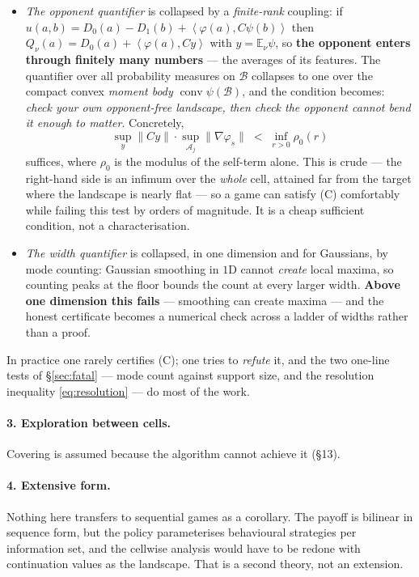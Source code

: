 \documentclass[11pt]{article}
\theoremstyle{definition}
\newcommand{\E}{\mathbb{E}}
\newcommand{\cA}{\mathcal{A}}
\newcommand{\cB}{\mathcal{B}}
\newcommand{\ip}[2]{\left\langle #1, #2 \right\rangle}
\DeclareMathOperator{\conv}{conv}
\begin{document}
\begin{itemize}[leftmargin=1.4em, itemsep=3pt]
\item \emph{The opponent quantifier} is collapsed by a \emph{finite-rank}
  coupling: if $u(a,b) = D_0(a) - D_1(b) + \ip{\varphi(a)}{C\psi(b)}$ then
  $Q_\nu(a) = D_0(a) + \ip{\varphi(a)}{Cy}$ with $y = \E_\nu \psi$, so
  \textbf{the opponent enters through finitely many numbers} --- the averages of
  its features. The quantifier over all probability measures on $\cB$ collapses
  to one over the compact convex \emph{moment body} $\conv \psi(\cB)$, and the
  condition becomes: \emph{check your own opponent-free landscape, then check the
  opponent cannot bend it enough to matter}. Concretely,
  \[
    \sup_{y} \|Cy\| \cdot \sup_{\cA_j}\|\nabla\varphi_s\|
    \;<\; \inf_{r>0} \rho_0(r)
  \]
  suffices, where $\rho_0$ is the modulus of the self-term alone. This is crude
  --- the right-hand side is an infimum over the \emph{whole} cell, attained far
  from the target where the landscape is nearly flat --- so a game can satisfy (C)
  comfortably while failing this test by orders of magnitude. It is a cheap
  sufficient condition, not a characterisation.
\item \emph{The width quantifier} is collapsed, in one dimension and for
  Gaussians, by mode counting: Gaussian smoothing in $1$D cannot \emph{create}
  local maxima, so counting peaks at the floor bounds the count at every larger
  width. \textbf{Above one dimension this fails} --- smoothing can create maxima ---
  and the honest certificate becomes a numerical check across a ladder of widths
  rather than a proof.
\end{itemize}

\noindent
In practice one rarely certifies (C); one tries to \emph{refute} it, and the two
one-line tests of \S\ref{sec:fatal} --- mode count against support size, and the
resolution inequality \eqref{eq:resolution} --- do most of the work.

\paragraph{3. Exploration between cells.} Covering is assumed because the
algorithm cannot achieve it (\S13).

\paragraph{4. Extensive form.} Nothing here transfers to sequential games as a
corollary. The payoff is bilinear in sequence form, but the policy parameterises
behavioural strategies per information set, and the cellwise analysis would have
to be redone with continuation values as the landscape. That is a second theory,
not an extension.
\end{document}
